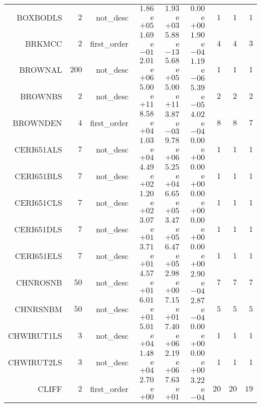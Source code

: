 \begin{longtable}{rrrrrrrrr}
BOXBODLS & \(     2\) & not\_desc & \( 1.86\)e\(+05\) & \( 1.93\)e\(+03\) & \( 0.00\)e\(+00\) & \(     1\) & \(     1\) & \(     1\) \\
BRKMCC & \(     2\) & first\_order & \( 1.69\)e\(-01\) & \( 5.88\)e\(-13\) & \( 1.90\)e\(-04\) & \(     4\) & \(     4\) & \(     3\) \\
BROWNAL & \(   200\) & not\_desc & \( 2.01\)e\(+06\) & \( 5.68\)e\(+05\) & \( 1.19\)e\(-06\) & \(     1\) & \(     1\) & \(     1\) \\
BROWNBS & \(     2\) & not\_desc & \( 5.00\)e\(+11\) & \( 5.00\)e\(+11\) & \( 5.39\)e\(-05\) & \(     2\) & \(     2\) & \(     2\) \\
BROWNDEN & \(     4\) & first\_order & \( 8.58\)e\(+04\) & \( 3.87\)e\(-03\) & \( 4.02\)e\(-04\) & \(     8\) & \(     8\) & \(     7\) \\
CERI651ALS & \(     7\) & not\_desc & \( 1.03\)e\(+04\) & \( 9.78\)e\(+06\) & \( 0.00\)e\(+00\) & \(     1\) & \(     1\) & \(     1\) \\
CERI651BLS & \(     7\) & not\_desc & \( 4.49\)e\(+02\) & \( 5.25\)e\(+04\) & \( 0.00\)e\(+00\) & \(     1\) & \(     1\) & \(     1\) \\
CERI651CLS & \(     7\) & not\_desc & \( 1.20\)e\(+02\) & \( 6.65\)e\(+05\) & \( 0.00\)e\(+00\) & \(     1\) & \(     1\) & \(     1\) \\
CERI651DLS & \(     7\) & not\_desc & \( 3.07\)e\(+01\) & \( 3.47\)e\(+05\) & \( 0.00\)e\(+00\) & \(     1\) & \(     1\) & \(     1\) \\
CERI651ELS & \(     7\) & not\_desc & \( 3.71\)e\(+01\) & \( 6.47\)e\(+05\) & \( 0.00\)e\(+00\) & \(     1\) & \(     1\) & \(     1\) \\
CHNROSNB & \(    50\) & not\_desc & \( 4.57\)e\(+01\) & \( 2.98\)e\(+00\) & \( 2.90\)e\(-04\) & \(     7\) & \(     7\) & \(     7\) \\
CHNRSNBM & \(    50\) & not\_desc & \( 6.01\)e\(+01\) & \( 7.15\)e\(+01\) & \( 2.87\)e\(-04\) & \(     5\) & \(     5\) & \(     5\) \\
CHWIRUT1LS & \(     3\) & not\_desc & \( 5.01\)e\(+04\) & \( 7.40\)e\(+06\) & \( 0.00\)e\(+00\) & \(     1\) & \(     1\) & \(     1\) \\
CHWIRUT2LS & \(     3\) & not\_desc & \( 1.48\)e\(+04\) & \( 2.19\)e\(+06\) & \( 0.00\)e\(+00\) & \(     1\) & \(     1\) & \(     1\) \\
CLIFF & \(     2\) & first\_order & \( 2.70\)e\(+00\) & \( 7.63\)e\(+01\) & \( 3.22\)e\(-04\) & \(    20\) & \(    20\) & \(    19\) \\

\end{longtable}

